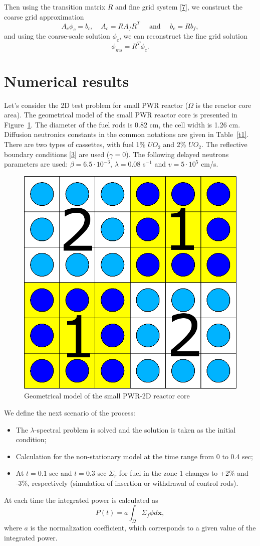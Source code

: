 \documentclass[10pt]{article}
\begin{document}
Then using the transition matrix $R$ and fine grid system \eqref{7}, we construct the coarse grid approximation
\begin{equation} \label{10}
	A_c \phi_c = b_c, \quad
	A_c = R A_f R^T \quad
	\text{ and } \quad
	b_c = R b_f,
\end{equation}
and using the coarse-scale solution $\phi_c$, we can reconstruct the fine grid solution
\[
	\phi_{ms} = R^T \phi_c.
\]

\section{Numerical results}
Let's consider the 2D test problem for small PWR reactor \cite{Forget2005} ($\Omega$ is the reactor core area).
The geometrical model of the small PWR reactor core is presented in Figure~\ref{p3}.
The diameter of the fuel rods is 0.82 cm, the cell width is 1.26 cm.
Diffusion neutronics constants in the common notations are given in Table~\ref{t1}.
There are two types of cassettes, with fuel 1\% $UO_2$ and 2\% $UO_2$.
The reflective boundary conditions \eqref{3} are used ($\gamma = 0$).
The following delayed neutrons parameters are used: $\beta = 6.5 \cdot 10^{-3}$, $\lambda = 0.08$ s$^{-1}$ and $v = 5 \cdot 10^5$ cm/s.

\begin{figure}[h]
	\begin{center}
    	\includegraphics[width=0.5\linewidth] {smallpwr.png}
		\caption{Geometrical model of the small PWR-2D reactor core}
		\label{p3}
	\end{center}
\end{figure}

We define the next scenario of the process:
\begin{itemize}
	\item The $\lambda$-spectral problem is solved and the solution is taken as the initial condition;
	\item Calculation for the non-stationary model at the time range from 0 to 0.4 sec;
	\item At $t = 0.1$ sec and $t = 0.3$ sec $\Sigma_r$ for fuel in the zone 1 changes to +2\% and -3\%, respectively (simulation of insertion or withdrawal of control rods).
\end{itemize}
At each time the integrated power is calculated as
\[
	P(t) = a \int_{\Omega} \Sigma_f \phi d \bm x,
\]
where $a$ is the normalization coefficient, which corresponds to a given value of the integrated power.
\end{document}
